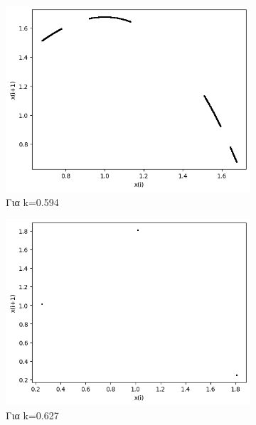 \begin{figure}[h!]
\begin{subfigure}[b]{0.25\textwidth}
		\includegraphics[width=\textwidth]{LateX images/graphs q07/g9}
		\caption{Για k=0.594}
		\label{f:k43}
	\end{subfigure}
	\hfill
	\begin{subfigure}[b]{0.25\textwidth}
		\centering
		\includegraphics[width=\textwidth]{LateX images/graphs q07/g10}
		\caption{Για k=0.627}
		\label{f:k44}
	\end{subfigure}
	\hfill
	\begin{subfigure}[b]{0.25\textwidth}
		\centering

\end{subfigure}
\end{figure}
